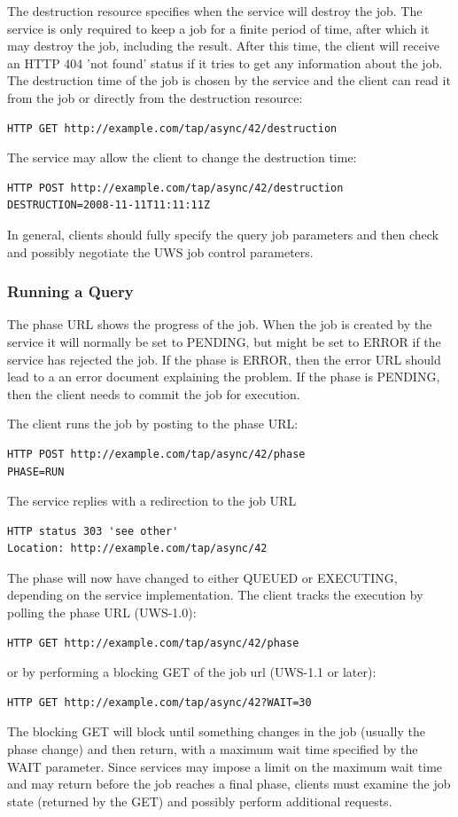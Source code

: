 \documentclass[11pt,letter]{ivoa}
\begin{document}
The destruction resource specifies when the service will destroy the job. The 
service is only required to keep a job for a finite period of time, after which 
it may destroy the job, including the result. After this time, the client will 
receive an HTTP 404 'not found' status if it tries to get any information about 
the job. The destruction time of the job is chosen by the service and the client 
can read it from the job or directly from the destruction resource:
\begin{verbatim}
HTTP GET http://example.com/tap/async/42/destruction
\end{verbatim}
The service may allow the client to change the destruction time:
\begin{verbatim}
HTTP POST http://example.com/tap/async/42/destruction
DESTRUCTION=2008-11-11T11:11:11Z
\end{verbatim}

In general, clients should fully specify the query job parameters and then 
check and possibly negotiate the UWS job control parameters.

\subsubsection{Running a Query}
The phase URL shows the progress of the job. When the job is created by the 
service it will normally be set to PENDING, but might be set to ERROR if the 
service has rejected the job. If the phase is ERROR, then the error URL should 
lead to a an error document explaining the problem. If the phase is PENDING, 
then the client needs to commit the job for execution.

The client runs the job by posting to the phase URL:
\begin{verbatim}
HTTP POST http://example.com/tap/async/42/phase
PHASE=RUN
\end{verbatim}

The service replies with a redirection to the job URL
\begin{verbatim}
HTTP status 303 'see other'
Location: http://example.com/tap/async/42
\end{verbatim}
The phase will now have changed to either QUEUED or EXECUTING, depending on the 
service implementation. The client tracks the execution by polling the phase 
URL (UWS-1.0):
\begin{verbatim}
HTTP GET http://example.com/tap/async/42/phase
\end{verbatim}
or by performing a blocking GET of the job url (UWS-1.1 or later):
\begin{verbatim}
HTTP GET http://example.com/tap/async/42?WAIT=30
\end{verbatim}
The blocking GET will block until something changes in the job (usually the phase
change) and then return, with a maximum wait time specified by the WAIT parameter. Since
services may impose a limit on the maximum wait time and may return before the job reaches
a final phase, clients must examine the job state (returned by the GET) and possibly perform
additional requests.
\end{document}
